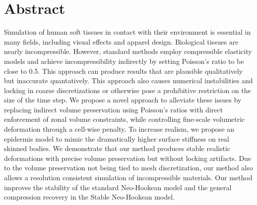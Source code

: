 
\chapter{Abstract}

Simulation of human soft tissues in contact with their environment
is essential in many fields, including visual effects and apparel
design.  Biological tissues are nearly incompressible. However,
standard methods employ compressible elasticity models and achieve
incompressibility indirectly by setting Poisson's ratio to be close
to 0.5.  This approach can produce results that are plausible
qualitatively but inaccurate quantatively. This approach also causes
numerical instabilities and locking in coarse discretizations or
otherwise pose a prohibitive restriction on the size of the time
step.
%
We propose a novel approach to alleviate these issues by
replacing indirect volume preservation using Poisson's ratios with
direct enforcement of zonal volume constraints, while controlling
fine-scale volumetric deformation through a cell-wise penalty.
To increase realism, we propose an epidermis model to mimic the
dramatically higher surface stiffness on real skinned bodies.
We demonstrate that our method produces stable realistic
deformations with precise volume preservation but without locking
artifacts. 
Due to the volume preservation not being tied to mesh discretization, our method also allows a
resolution consistent simulation of incompressible materials.
Our method improves the stability of the standard
Neo-Hookean model and the general compression recovery in the Stable
Neo-Hookean model.

